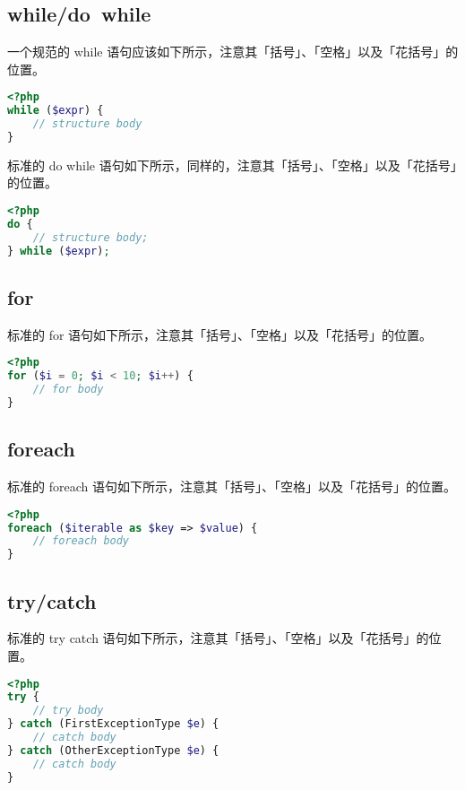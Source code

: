 \subsection{while/do~while}

一个规范的 while 语句应该如下所示，注意其「括号」、「空格」以及「花括号」的位置。

\begin{lstlisting}[language=PHP]
<?php
while ($expr) {
    // structure body
}
\end{lstlisting}

标准的 do while 语句如下所示，同样的，注意其「括号」、「空格」以及「花括号」的位置。



\begin{lstlisting}[language=PHP]
<?php
do {
    // structure body;
} while ($expr);
\end{lstlisting}


\subsection{for}

标准的 for 语句如下所示，注意其「括号」、「空格」以及「花括号」的位置。



\begin{lstlisting}[language=PHP]
<?php
for ($i = 0; $i < 10; $i++) {
    // for body
}
\end{lstlisting}


\subsection{foreach}

标准的 foreach 语句如下所示，注意其「括号」、「空格」以及「花括号」的位置。



\begin{lstlisting}[language=PHP]
<?php
foreach ($iterable as $key => $value) {
    // foreach body
}
\end{lstlisting}

\subsection{try/catch}

标准的 try catch 语句如下所示，注意其「括号」、「空格」以及「花括号」的位置。

\begin{lstlisting}[language=PHP]
<?php
try {
    // try body
} catch (FirstExceptionType $e) {
    // catch body
} catch (OtherExceptionType $e) {
    // catch body
}
\end{lstlisting}

